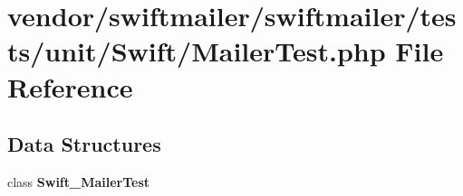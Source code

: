 \section{vendor/swiftmailer/swiftmailer/tests/unit/\+Swift/\+Mailer\+Test.php File Reference}
\label{_mailer_test_8php}
\subsection*{Data Structures}
\begin{DoxyCompactItemize}
\item 
class {\bf Swift\+\_\+\+Mailer\+Test}
\end{DoxyCompactItemize}
